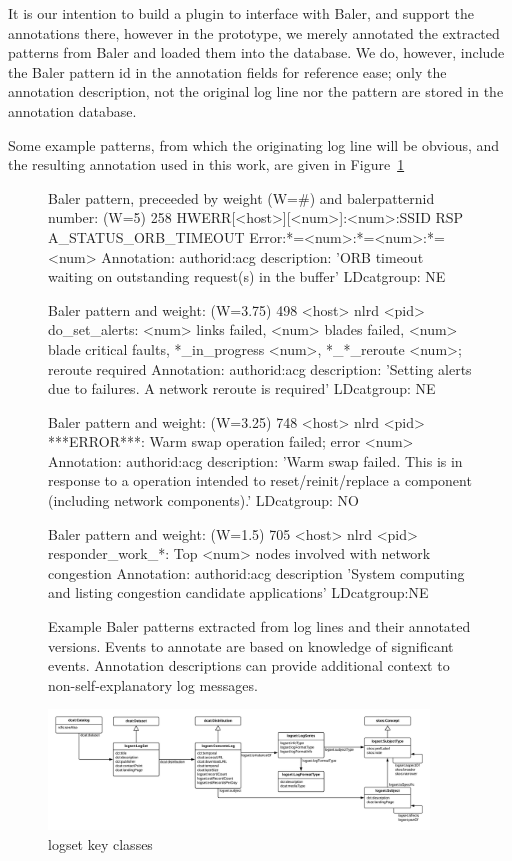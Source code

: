 It is our intention to
build a plugin to interface with Baler, and support the annotations there,
however in the prototype, we merely annotated the extracted patterns from
Baler and loaded them into the database.
We do, however, include the Baler pattern id in the annotation fields
for reference ease; only the annotation description, not the original log line nor the pattern
are stored in the annotation database.

Some example patterns, from which the originating log line will be obvious, and
the resulting annotation used in this work, are given in Figure~\ref{f:baler}

\begin{figure}
\begin{annol}

Baler pattern, preceeded by weight (W=#) and balerpatternid number:
(W=5)        258   HWERR[<host>][<num>]:<num>:SSID RSP A_STATUS_ORB_TIMEOUT Error:*=<num>:*=<num>:*=<num>
Annotation:
authorid:acg  description: 'ORB timeout waiting on outstanding request(s) in the buffer'  LDcatgroup: NE

Baler pattern and weight:
(W=3.75)     498   <host> nlrd <pid> do_set_alerts: <num> links failed, <num> blades failed, <num> blade critical faults, *_in_progress <num>, *_*_reroute <num>; reroute required
Annotation:
authorid:acg  description: 'Setting alerts due to failures. A network reroute is required' LDcatgroup: NE

Baler pattern and weight:
(W=3.25)     748   <host> nlrd <pid> ***ERROR***: Warm swap operation failed; error <num>
Annotation:
authorid:acg description: 'Warm swap failed. This is in response to a operation intended to reset/reinit/replace a component (including network components).' LDcatgroup: NO

Baler pattern and weight:
(W=1.5)      705   <host> nlrd <pid> responder_work_*: Top <num> nodes involved with network congestion
Annotation:
authorid:acg description 'System computing and listing congestion candidate applications' LDcatgroup:NE
\end{annol}
\caption{Example Baler patterns extracted from log lines and their annotated versions. Events to annotate are based on
knowledge of significant events. Annotation descriptions can provide additional context to non-self-explanatory log messages.}
\label{f:baler}
\end{figure}

\begin{figure}
\includegraphics[width=0.9\textwidth]{logset-key-classes.png}
\caption{logset key classes}
\end{figure}







